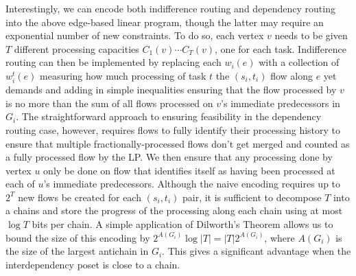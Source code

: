 Interestingly, we can encode both {indifference routing} and {dependency routing} into the above edge-based linear program, though the latter may require an exponential number of new constraints. To do so, each vertex $v$ needs to be given $T$ different processing capacities $C_1(v) \cdots C_{T}(v)$, one for each task. {Indifference routing} can then be implemented by replacing each $w_i(e)$ with a collection of $w_i^t(e)$ measuring how much processing of task $t$ the $(s_i, t_i)$ flow along $e$ yet demands and adding in simple inequalities ensuring that the flow processed by $v$ is no more than the sum of all flows processed on $v$'s immediate predecessors in $G_i$. The straightforward approach to ensuring feasibility in the {dependency routing} case, however, requires flows to fully identify their processing history to ensure that multiple fractionally-processed flows don't get merged and counted as a fully processed flow by the LP. We then ensure that any processing done by vertex $u$ only be done on flow that identifies itself as having been processed at each of $u$'s immediate predecessors. Although the naive encoding requires up to $2^T$ new flows be created for each $(s_i, t_i)$ pair, it is sufficient to decompose $T$ into a chains and store the progress of the processing along each chain using at most $\log T$ bits per chain. A simple application of Dilworth's Theorem\cite{Dilworth} allows us to bound the size of this encoding by $2^{A(G_i)} \log |T| = |T| 2^{A(G_i)}$, where $A(G_i)$ is the size of the largest antichain in $G_i$. This gives a significant advantage when the interdependency poset is close to a chain. %


